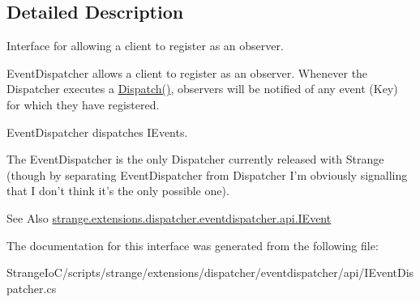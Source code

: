 \subsection{Detailed Description}
Interface for allowing a client to register as an observer. 

Event\-Dispatcher allows a client to register as an observer. Whenever the Dispatcher executes a {\ttfamily \hyperlink{interfacestrange_1_1extensions_1_1dispatcher_1_1api_1_1_i_dispatcher_afec6755050bf9891321a7bfd4da1f06b}{Dispatch()}}, observers will be notified of any event (Key) for which they have registered.

Event\-Dispatcher dispatches I\-Events.

The Event\-Dispatcher is the only Dispatcher currently released with Strange (though by separating Event\-Dispatcher from Dispatcher I'm obviously signalling that I don't think it's the only possible one).

\begin{DoxySeeAlso}{See Also}
\hyperlink{interfacestrange_1_1extensions_1_1dispatcher_1_1eventdispatcher_1_1api_1_1_i_event}{strange.\-extensions.\-dispatcher.\-eventdispatcher.\-api.\-I\-Event} 
\end{DoxySeeAlso}


The documentation for this interface was generated from the following file\-:\begin{DoxyCompactItemize}
\item 
Strange\-Io\-C/scripts/strange/extensions/dispatcher/eventdispatcher/api/I\-Event\-Dispatcher.\-cs\end{DoxyCompactItemize}

